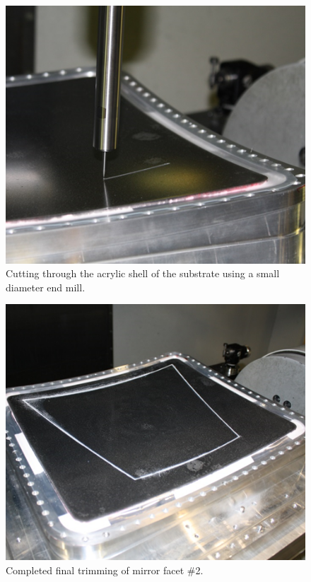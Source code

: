 \begin{figure}[ht]
    \centering
    \includegraphics[width=1.0\linewidth]{images/Trimming_1}
    \caption{Cutting through the acrylic shell of the substrate using a small diameter end mill.}
    \label{fig:Trimming_1}
\end{figure}

\begin{figure}[ht]
    \centering
    \includegraphics[width=1.0\linewidth]{images/Trimming_2}
    \caption{Completed final trimming of mirror facet \#2.}
    \label{fig:Trimming_2}
\end{figure}

